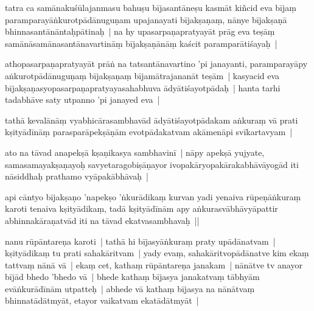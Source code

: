 \documentclass[article,12pt,a4paper]{memoir}%
\newcounter{parCount}
\begin{document}
	  \pstart \leavevmode%
	\label{thakur75-79.15}tatra ca samānakuśūlajanmasu bahuṣu bījasantāneṣu kasmāt kiñcid eva bījaṃ paramparayāṅkurotpādānuguṇam upajanayati bījakṣaṇaṃ, nānye bījakṣaṇā bhinnasantānāntaḥpātinaḥ | na hy upasarpaṇapratyayāt prāg eva teṣāṃ samānāsamānasantānavartināṃ bījakṣaṇānāṃ kaścit paramparātiśayaḥ | 
	{}
	\pend%
      

	  \pstart \leavevmode%
	\label{thakur75-79.18}athopasarpaṇapratyayāt prāṅ na tatsantānavartino 'pi janayanti, paramparayāpy aṅkurotpādānuguṇaṃ bījakṣaṇaṃ bījamātrajananāt teṣām | kasyacid eva bījakṣaṇasyopasarpaṇapratyayasahabhuva ādyātiśayotpādaḥ | hanta tarhi tadabhāve saty utpanno 'pi janayed eva | 
	{}
	\pend%
      

	  \pstart \leavevmode%
	\label{thakur75-79.21}tathā kevalānāṃ vyabhicārasambhavād ādyātiśayotpādakam aṅkuraṃ vā prati kṣityādīnāṃ parasparāpekṣāṇām evotpādakatvam akāmenāpi svīkartavyam | 
	{}
	\pend%
      

	  \pstart \leavevmode%
	\label{thakur75-79.22}ato na tāvad anapekṣā kṣaṇikasya sambhavinī | nāpy apekṣā yujyate, samasamayakṣaṇayoḥ savyetaragobiṣāṇayor ivopakāryopakārakabhāvāyogād iti nāsiddhaḥ prathamo vyāpakābhāvaḥ |
	{}
	\pend%
      

	  \pstart \leavevmode%
	\label{thakur75-79.25}api cāntyo bījakṣaṇo 'napekṣo 'ṅkurādikaṃ kurvan yadi yenaiva rūpeṇāṅkuraṃ karoti tenaiva kṣityādikaṃ, tadā kṣityādīnām apy aṅkurasvābhāvyāpattir abhinnakāraṇatvād iti na tāvad ekatvasambhavaḥ ||
	{}
	\pend%
      

	  \pstart \leavevmode%
	\label{thakur75-79.28}nanu rūpāntareṇa karoti | tathā hi bījasyāṅkuraṃ praty upādānatvam | kṣityādikaṃ tu prati sahakāritvam | yady evaṃ, sahakāritvopādānatve kim ekaṃ tattvaṃ nānā vā | ekaṃ cet, kathaṃ rūpāntareṇa janakam | nānātve tv anayor bījād bhedo 'bhedo vā | bhede kathaṃ bījasya janakatvaṃ tābhyām evāṅkurādīnām utpatteḥ | abhede vā kathaṃ bījasya na nānātvaṃ bhinnatādātmyāt, etayor vaikatvam ekatādātmyāt |
	{}
	\pend%
      
\end{document}
